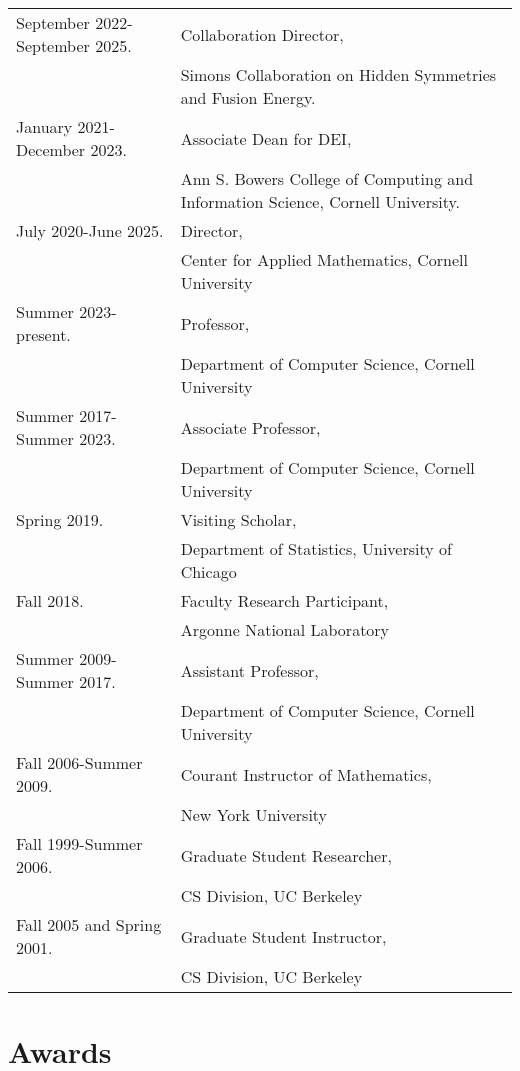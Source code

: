 \documentclass{article}
\begin{document}
\begin{tabular}{ll}
  September 2022-September 2025.
    & Collaboration Director,\\
    & Simons Collaboration on Hidden Symmetries and Fusion Energy. \\
  January 2021-December 2023.
    & Associate Dean for DEI, \\
    & Ann S. Bowers College of Computing and Information Science, Cornell University. \\
  July 2020-June 2025.
    & Director, \\
    & Center for Applied Mathematics, Cornell University \\
  Summer 2023-present.
    & Professor, \\
    & Department of Computer Science, Cornell University \\
  Summer 2017-Summer 2023.
    & Associate Professor, \\
    & Department of Computer Science, Cornell University \\
  Spring 2019.
    & Visiting Scholar, \\
    & Department of Statistics, University of Chicago \\
  Fall 2018.
    & Faculty Research Participant, \\
    & Argonne National Laboratory \\
  Summer 2009-Summer 2017.
    & Assistant Professor, \\
    & Department of Computer Science, Cornell University \\
  Fall 2006-Summer 2009.
    & Courant Instructor of Mathematics, \\
    & New York University \\
  Fall 1999-Summer 2006.
    & Graduate Student Researcher, \\
    & CS Division, UC Berkeley \\
  Fall 2005 and Spring 2001.
    & Graduate Student Instructor, \\
    & CS Division, UC Berkeley
\end{tabular}


\section*{Awards}



\end{document}
